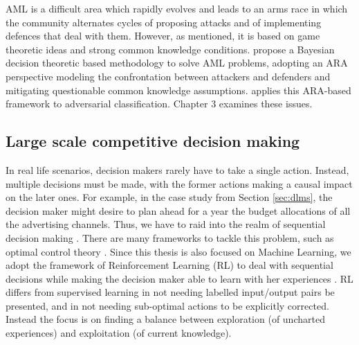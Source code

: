 AML is a  difficult area which rapidly evolves and leads to an 
arms race in which the community alternates cycles of proposing attacks and  of implementing defences that deal with them. However, as mentioned, it is 
based on game theoretic ideas and strong common
knowledge conditions. 
\parencite{AMLARA} propose a
Bayesian decision theoretic based methodology 
to solve AML problems, 
adopting an ARA perspective \parencite{adversarialRiskAnalysis2009,banks2015adversarial} modeling the confrontation between attackers and defenders and mitigating questionable common knowledge assumptions. \parencite{math8111957} applies this ARA-based framework to  adversarial classification. Chapter 3 examines these issues.





\subsection{Large scale competitive decision making}

In real life scenarios, decision makers rarely have to take a single action. Instead, multiple decisions must be made, with the former actions making a causal impact on the later ones. For example, in the case study from Section \ref{sec:dlms}, the decision maker might desire to plan ahead for a year the budget allocations of all the advertising channels. Thus, we have to raid into the realm of sequential decision making \parencite{french2000statistical,DIEDERICH200113917}. There are many frameworks to tackle this problem, such as optimal control theory \parencite{kirk2004optimal}. Since this thesis is also focused on Machine Learning, we adopt the framework of Reinforcement Learning (RL) to deal with sequential decisions while making the decision maker able to learn with her experiences \parencite{sutton2012reinforcement,kaelbling1996reinforcement}. RL differs from supervised learning in not needing labelled input/output pairs be presented, and in not needing sub-optimal actions to be explicitly corrected. Instead the focus is on finding a balance between exploration (of uncharted experiences) and exploitation (of current knowledge).

